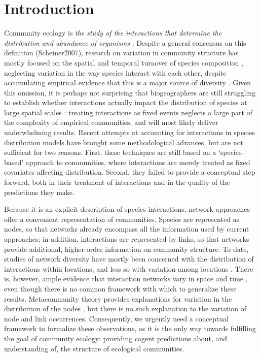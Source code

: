 \documentclass[12pt]{article}
\begin{document}
\newpage

\section*{Introduction}

Community ecology is \textit{the study of the interactions that determine
the distribution and abundance of organisms} \citep{Krebs2001}. Despite a
general consensus on this definition (Scheiner2007), research on variation in
community structure has mostly focused on the spatial and temporal turnover
of species composition \citep{Anderson2011}, neglecting variation in the way
species interact with each other, despite accumulating empirical evidence that
this is a major source of diversity \citep{Poisot2015a}. Given this omission,
it is perhaps not surprising that biogeographers are still struggling to
establish whether interactions actually impact the distribution of species at
large spatial scales \citep{Wisz2012, Kissling2012}: treating interactions
as fixed events neglects a large part of the complexity of empirical
communities, and will most likely deliver underwhelming results. Recent
attempts at accounting for interactions in species distribution models
\citep{Pollock2014, Pelissier2013} have brought some methodological advances,
but are not sufficient for two reasons. First, these techniques are still
based on a `species-based' approach to communities, where interactions
are merely treated as fixed covariates affecting distribution. Second,
they failed to provide a conceptual step forward, both in their treatment
of interactions and in the quality of the predictions they make.

Because it is an explicit description of species interactions, network
approaches offer a convenient representation of communities. Species are
represented as nodes, so that networks already encompass all the information
used by current approaches; in addition, interactions are represented by
links, so that networks provide additional, higher-order information on
community structure. To date, studies of network diversity have mostly been
concerned with the distribution of interactions within locations, and less so
with variation among locations \citep{Dunne2005, Bascompte2007, Ings2007,
Kefi2012}. There is, however, ample evidence that interaction networks vary in
space and time \citep{Laliberte2010, Poisot2012, Albouy2014, Poisot2016,
Trojelsgaard2015}, even though there is no common framework with which to
generalize these results. Metacommunity theory provides explanations for
variation in the distribution of the nodes \citep{Gravel2011c, Pillai2011},
but there is no such explanation to the variation of node and link
occurrences. Consequently, we urgently need a conceptual framework to
formalize these observations, as it is the only way towards fulfilling the
goal of community ecology: providing cogent predictions about, and
understanding of, the structure of ecological communities.
\end{document}
